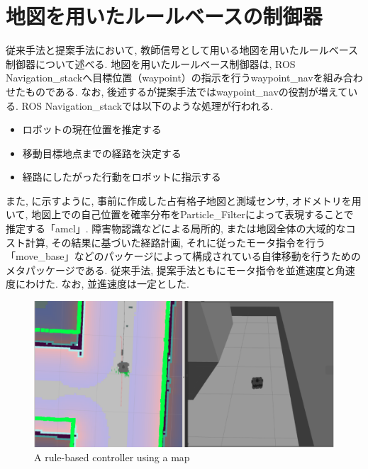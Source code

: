 
\section{地図を用いたルールベースの制御器}
従来手法と提案手法において, 教師信号として用いる地図を用いたルールベース制御器について述べる. 地図を用いたルールベース制御器は, ROS Navigation\_stack\cite{navigation:online}へ目標位置（waypoint）の指示を行うwaypoint\_nav\cite{waypoint_nav:online}を組み合わせたものである. なお, 後述するが提案手法ではwaypoint\_navの役割が増えている. ROS Navigation\_stackでは以下のような処理が行われる. 

\begin{itemize}
  \item ロボットの現在位置を推定する
  \item 移動目標地点までの経路を決定する
  \item 経路にしたがった行動をロボットに指示する
\end{itemize}

また, に示すように, 事前に作成した占有格子地図と測域センサ, オドメトリを用いて, 地図上での自己位置を確率分布をParticle\_Filterによって表現することで推定する「amcl」. 障害物認識などによる局所的, または地図全体の大域的なコスト計算, その結果に基づいた経路計画, それに従ったモータ指令を行う「move\_base」などのパッケージによって構成されている自律移動を行うためのメタパッケージである. 従来手法, 提案手法ともにモータ指令を並進速度と角速度にわけた. なお, 並進速度は一定とした.


\begin{figure}[hbtp]
  \centering
 \includegraphics[keepaspectratio, scale=0.7]
      {images/navigation.png}
 \caption{A rule-based controller using a map}
 \label{Fig:navigation}
\end{figure}

\newpage